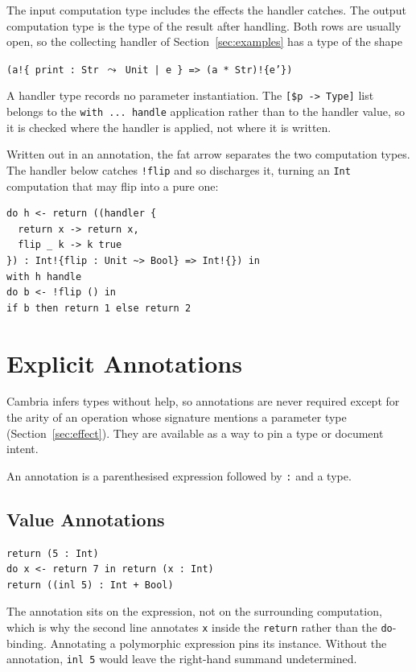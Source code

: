 \documentclass[11pt,a4paper]{article}
\newcommand{\cba}[1]{\lstinline[style=cbainline]{#1}}
\begin{document}
The input computation type includes the effects the handler catches.  The
output computation type is the type of the result after handling.  Both rows
are usually open, so the collecting handler of Section~\ref{sec:examples} has
a type of the shape

\begin{center}
\texttt{(a!\{ print : Str \(\leadsto\) Unit | e \} => (a * Str)!\{e'\})}
\end{center}

A handler type records no parameter instantiation.  The
\texttt{[\$p -> Type]} list belongs to the \cba{with ... handle}
application rather than to the handler value, so it is checked where the
handler is applied, not where it is written.

Written out in an annotation, the fat arrow separates the two computation
types.  The handler below catches \cba{!flip} and so discharges it, turning
an \texttt{Int} computation that may flip into a pure one:

\begin{lstlisting}
do h <- return ((handler {
  return x -> return x,
  flip _ k -> k true
}) : Int!{flip : Unit ~> Bool} => Int!{}) in
with h handle
do b <- !flip () in
if b then return 1 else return 2
\end{lstlisting}

\section{Explicit Annotations}
\label{sec:annotations}

Cambria infers types without help, so annotations are never required except
for the arity of an operation whose signature mentions a parameter type
(Section~\ref{sec:effect}).  They are available as a way to pin
a type or document intent.

An annotation is a parenthesised expression followed by \texttt{:} and a
type.

\subsection{Value Annotations}

\begin{lstlisting}
return (5 : Int)
do x <- return 7 in return (x : Int)
return ((inl 5) : Int + Bool)
\end{lstlisting}

The annotation sits on the expression, not on the surrounding computation,
which is why the second line annotates \texttt{x} inside the \cba{return}
rather than the \cba{do}-binding.  Annotating a polymorphic expression pins
its instance. Without the annotation, \cba{inl 5} would leave the right-hand
summand undetermined.
\end{document}
